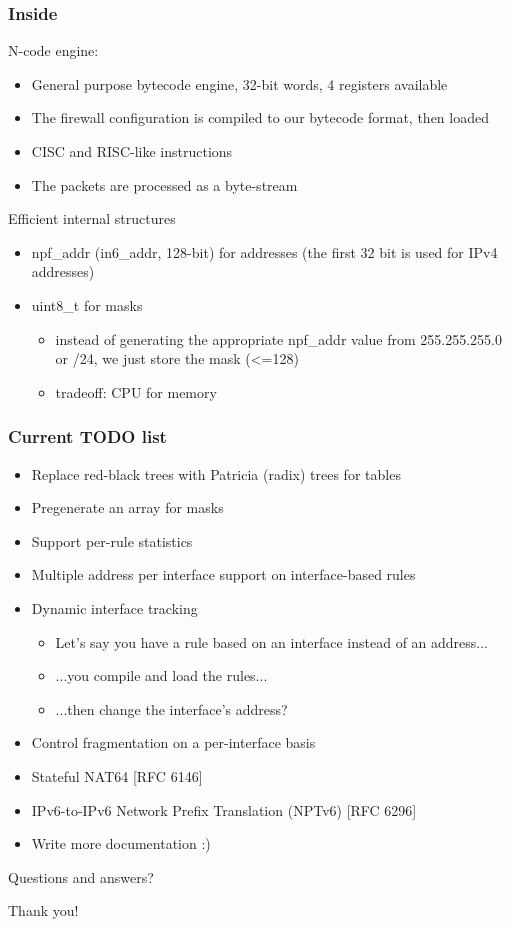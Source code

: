 \documentclass[magyar]{beamer}
\begin{document}
\begin{frame}
\frametitle{Inside}
N-code engine:
\begin{itemize}
	\item General purpose bytecode engine, 32-bit words, 4 registers available
	\item The firewall configuration is compiled to our bytecode format, then loaded
	\item CISC and RISC-like instructions
	\item The packets are processed as a byte-stream
\end{itemize}
Efficient internal structures
\begin{itemize}
	\item npf\_addr (in6\_addr, 128-bit) for addresses (the first 32 bit is used for IPv4 addresses)
	\item uint8\_t for masks
	\begin{itemize}
		\item instead of generating the appropriate npf\_addr value from  255.255.255.0 or /24, we just store
the mask (<=128)
		\item tradeoff: CPU for memory
	\end{itemize}
\end{itemize}
\end{frame}

\begin{frame}
\frametitle{Current TODO list}
\begin{itemize}
	\item Replace red-black trees with Patricia (radix) trees for tables
\pause
	\item Pregenerate an array for masks
\pause
	\item Support per-rule statistics
\pause
	\item Multiple address per interface support on interface-based rules
	\item Dynamic interface tracking
		\begin{itemize}
			\item Let's say you have a rule based on an interface instead of an address...
			\item ...you compile and load the rules...
			\item ...then change the interface's address?
		\end{itemize}
	\item Control fragmentation on a per-interface basis
\pause
	\item Stateful NAT64 [RFC 6146]
	\item IPv6-to-IPv6 Network Prefix Translation (NPTv6) [RFC 6296]
\pause
	\item Write more documentation :)
\end{itemize}
\end{frame}

\begin{frame}
\begin{center}
Questions and answers?
\end{center}
\end{frame}

\begin{frame}
\begin{center}
Thank you!
\end{center}
\end{frame}
\end{document}
